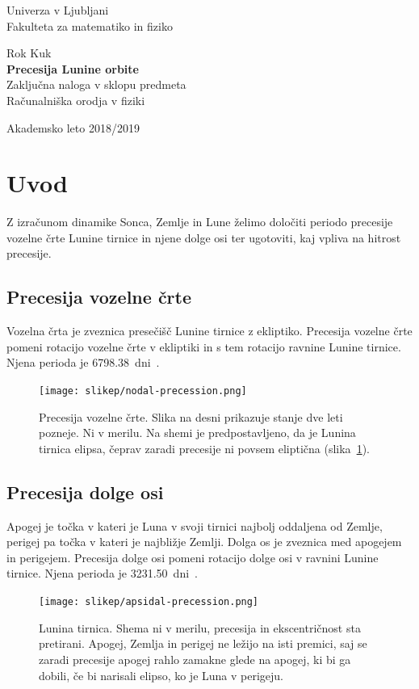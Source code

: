 \documentclass[a4paper,12pt]{article}
\begin{document}
\begin{titlepage}
\begin{center}
{\large \sc Univerza v Ljubljani \\
Fakulteta za matematiko in fiziko}

\vspace{5cm}

{\Large Rok Kuk\\}
\vspace{10mm}
{\bf \Large Precesija Lunine orbite}\\
\vspace{25mm}
{\large Zaključna naloga v sklopu predmeta \\
Računalniška orodja v fiziki}\\

\vfill

{\normalsize \sc Akademsko leto 2018/2019}
\end{center}
\end{titlepage}

\newpage
\section{Uvod}

Z izračunom dinamike Sonca, Zemlje in Lune želimo določiti periodo precesije 
vozelne črte Lunine tirnice in njene dolge osi ter ugotoviti, kaj vpliva na 
hitrost precesije.

\subsection{Precesija vozelne črte}
Vozelna črta je zveznica presečišč Lunine tirnice z ekliptiko. Precesija 
vozelne črte pomeni rotacijo vozelne črte v ekliptiki in s tem rotacijo
ravnine Lunine tirnice. Njena perioda je \SI{6798.38}{dni}~\cite{nasassd}.
\begin{figure}[h!]
    \centering
    \texttt{[image: slikep/nodal-precession.png]}
    \caption{Precesija vozelne črte. Slika na desni prikazuje stanje dve leti 
    pozneje. Ni v merilu. Na shemi je predpostavljeno, da je Lunina tirnica 
    elipsa, čeprav zaradi precesije ni povsem eliptična 
    (slika~\ref{fig:apsidal}).~\cite{nodal}}
\end{figure}

\subsection{Precesija dolge osi}
Apogej je točka v kateri je Luna v svoji tirnici najbolj oddaljena od Zemlje,
perigej pa točka v kateri je najbližje Zemlji. Dolga os je zveznica med apogejem 
in perigejem. Precesija dolge osi pomeni rotacijo dolge osi v ravnini Lunine 
tirnice. Njena perioda je \SI{3231.50}{dni}~\cite{nasassd}.
\begin{figure}[h!]
    \centering
    \texttt{[image: slikep/apsidal-precession.png]}
    \caption{Lunina tirnica. Shema ni v merilu, precesija in ekscentričnost 
    sta pretirani. Apogej, Zemlja in perigej ne ležijo na isti premici, saj se 
    zaradi precesije apogej rahlo zamakne glede na  apogej, ki bi ga dobili, če
    bi narisali elipso, ko je Luna v perigeju.}
    \label{fig:apsidal}
\end{figure}
\end{document}
